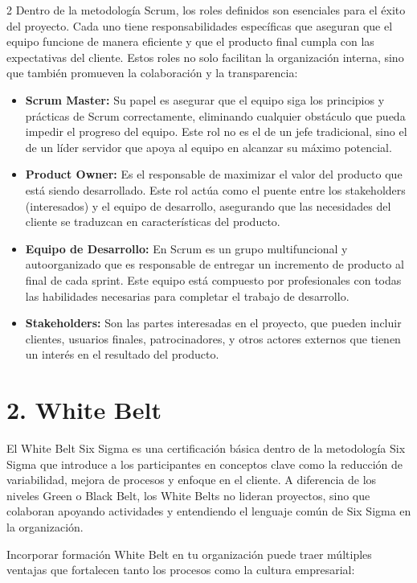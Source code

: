 \documentclass[10pt,a4paper]{article}
\begin{document}
\begin{multicols}{2}
Dentro de la metodología Scrum, los roles definidos son esenciales para el éxito del proyecto. Cada uno tiene responsabilidades específicas que aseguran que el equipo funcione de manera eficiente y que el producto final cumpla con las expectativas del cliente. Estos roles no solo facilitan la organización interna, sino que también promueven la colaboración y la transparencia:

\begin{itemize}[leftmargin=*, noitemsep, topsep=0pt]
    \item \textbf{Scrum Master:} Su papel es asegurar que el equipo siga los principios y prácticas de Scrum correctamente, eliminando cualquier obstáculo que pueda impedir el progreso del equipo. Este rol no es el de un jefe tradicional, sino el de un líder servidor que apoya al equipo en alcanzar su máximo potencial.
    \item \textbf{Product Owner:} Es el responsable de maximizar el valor del producto que está siendo desarrollado. Este rol actúa como el puente entre los stakeholders (interesados) y el equipo de desarrollo, asegurando que las necesidades del cliente se traduzcan en características del producto.
    \item \textbf{Equipo de Desarrollo:} En Scrum es un grupo multifuncional y autoorganizado que es responsable de entregar un incremento de producto al final de cada sprint. Este equipo está compuesto por profesionales con todas las habilidades necesarias para completar el trabajo de desarrollo.
    \item \textbf{Stakeholders:} Son las partes interesadas en el proyecto, que pueden incluir clientes, usuarios finales, patrocinadores, y otros actores externos que tienen un interés en el resultado del producto.
\end{itemize}

\section*{2. White Belt}
El White Belt Six Sigma es una certificación básica dentro de la metodología Six Sigma que introduce a los participantes en conceptos clave como la reducción de variabilidad, mejora de procesos y enfoque en el cliente. A diferencia de los niveles Green o Black Belt, los White Belts no lideran proyectos, sino que colaboran apoyando actividades y entendiendo el lenguaje común de Six Sigma en la organización.

Incorporar formación White Belt en tu organización puede traer múltiples ventajas que fortalecen tanto los procesos como la cultura empresarial:


\end{multicols}
\end{document}
